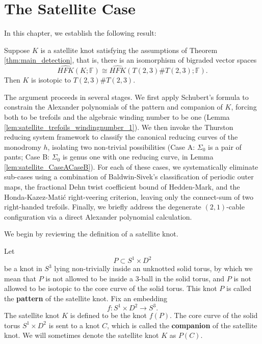 \chapter{The Satellite Case}
\label{chap:satellite}

In this chapter, we establish the following result:

\begin{theorem}\label{theorem:satellite}
    Suppose $K$ is a satellite knot satisfying the assumptions of Theorem \ref{thm:main_detection}, that is, there is an isomorphism of bigraded vector spaces
    \[
    \widehat{HFK}(K;\mathbb{F}) \cong \widehat{HFK}(T(2,3) \# T(2,3);\mathbb{F}).
    \]
    Then $K$ is isotopic to $T(2,3) \# T(2,3)$.
\end{theorem}

The argument proceeds in several stages. We first apply Schubert's formula to constrain the Alexander polynomials of the pattern and companion of $K$, forcing both to be trefoils and the algebraic winding number to be one (Lemma \ref{lem:satellite_trefoils_windingnumber_1}). We then invoke the Thurston reducing system framework to classify the canonical reducing curves of the monodromy $h$, isolating two non-trivial possibilities (Case A: $\Sigma_0$ is a pair of pants; Case B: $\Sigma_0$ is genus one with one reducing curve, in Lemma \ref{lem:satellite_CaseACaseB}). For each of these cases, we systematically eliminate sub-cases using a combination of Baldwin-Sivek's classification of periodic outer maps, the fractional Dehn twist coefficient bound of Hedden-Mark, and the Honda-Kazez-Matić right-veering criterion, leaving only the connect-sum of two right-handed trefoils. Finally, we briefly address the degenerate $(2,1)$-cable configuration via a direct Alexander polynomial calculation.

We begin by reviewing the definition of a satellite knot.

Let
\[
P \subset S^1 \times D^2
\]
be a knot in $S^3$ lying non-trivially inside an unknotted solid torus, by which we mean that $P$ is not allowed to be inside a 3-ball in the solid torus, and $P$ is not allowed to be isotopic to the core curve of the solid torus. This knot $P$ is called the \textbf{pattern} of the satellite knot. Fix an embedding
\[
f\colon  S^1 \times D^2 \to S^3.
\]
The satellite knot $K$ is defined to be the knot $f(P)$. The core curve of the solid torus $S^1 \times D^2$ is sent to a knot $C$, which is called the \textbf{companion} of the satellite knot. We will sometimes denote the satellite knot $K$ as $P(C)$.

